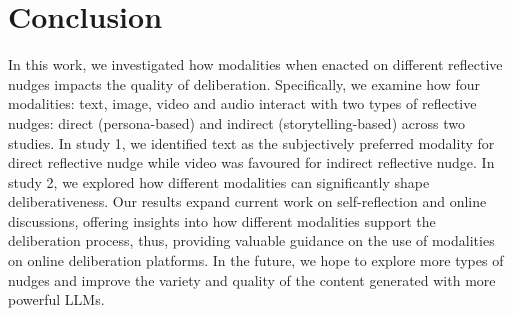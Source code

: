 \section{Conclusion}
In this work, we investigated how modalities when enacted on different reflective nudges impacts the quality of deliberation. Specifically, we examine how four modalities: text, image, video and audio interact with two types of reflective nudges: direct (persona-based) and indirect (storytelling-based) across two studies. In study 1, we identified text as the subjectively preferred modality for direct reflective nudge while video was favoured for indirect reflective nudge. In study 2, we explored how different modalities can significantly shape deliberativeness. Our results expand current work on self-reflection and online discussions, offering insights into how different modalities support the deliberation process, thus, providing valuable guidance on the use of modalities on online deliberation platforms. In the future, we hope to explore more types of nudges and improve the variety and quality of the content generated with more powerful LLMs.